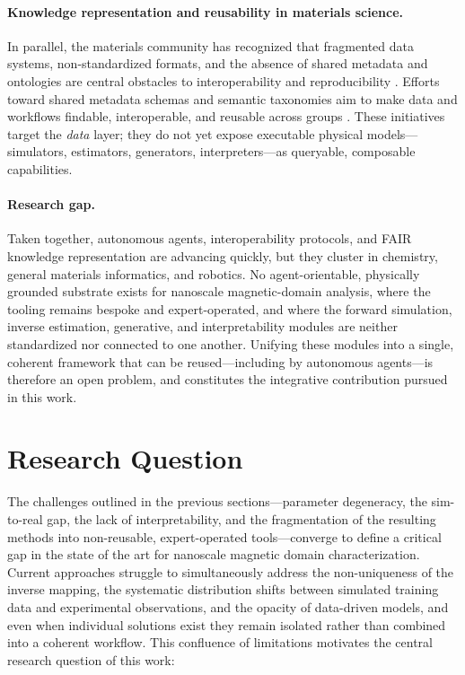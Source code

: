 \documentclass[letterpaper, 12, one column]{article}
\begin{document}
\paragraph{Knowledge representation and reusability in materials science.}
In parallel, the materials community has recognized that fragmented data systems, non-standardized formats, and the absence of shared metadata and ontologies are central obstacles to interoperability and reproducibility \cite{brinson2023community}. Efforts toward shared metadata schemas and semantic taxonomies aim to make data and workflows findable, interoperable, and reusable across groups \cite{ghiringhelli2023shared}. These initiatives target the \emph{data} layer; they do not yet expose executable physical models---simulators, estimators, generators, interpreters---as queryable, composable capabilities.

\paragraph{Research gap.}
Taken together, autonomous agents, interoperability protocols, and FAIR knowledge representation are advancing quickly, but they cluster in chemistry, general materials informatics, and robotics. No agent-orientable, physically grounded substrate exists for nanoscale magnetic-domain analysis, where the tooling remains bespoke and expert-operated, and where the forward simulation, inverse estimation, generative, and interpretability modules are neither standardized nor connected to one another. Unifying these modules into a single, coherent framework that can be reused---including by autonomous agents---is therefore an open problem, and constitutes the integrative contribution pursued in this work.

\section{Research Question}

The challenges outlined in the previous sections—parameter degeneracy, the sim-to-real gap, the lack of interpretability, and the fragmentation of the resulting methods into non-reusable, expert-operated tools—converge to define a critical gap in the state of the art for nanoscale magnetic domain characterization. Current approaches struggle to simultaneously address the non-uniqueness of the inverse mapping, the systematic distribution shifts between simulated training data and experimental observations, and the opacity of data-driven models, and even when individual solutions exist they remain isolated rather than combined into a coherent workflow. This confluence of limitations motivates the central research question of this work:
\end{document}

